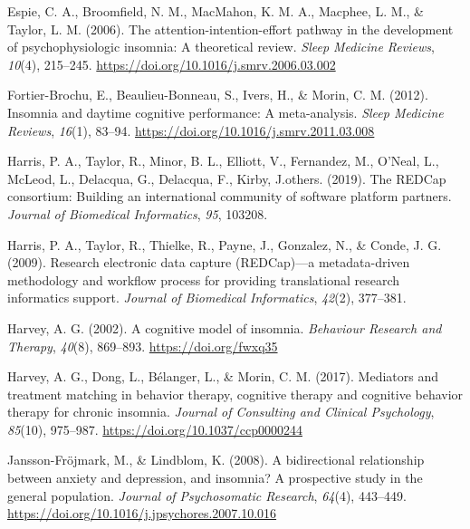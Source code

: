 \documentclass[
  ,doc,11pt, twoside,floatsintext]{apa6}
\newlength{\cslhangindent}
\newlength{\cslentryspacingunit} %
\newenvironment{CSLReferences}[2] %
 {%
  \setlength{\parindent}{0pt}
  \ifodd #1
  \let\oldpar\par
  \def\par{\hangindent=\cslhangindent\oldpar}
  \fi
  \setlength{\parskip}{#2\cslentryspacingunit}
 }%
 {}
\begin{document}
\begin{CSLReferences}{1}{0}
\leavevmode{}%
Espie, C. A., Broomfield, N. M., MacMahon, K. M. A., Macphee, L. M., \& Taylor, L. M. (2006). The attention-intention-effort pathway in the development of psychophysiologic insomnia: A theoretical review. \emph{Sleep Medicine Reviews}, \emph{10}(4), 215--245. \url{https://doi.org/10.1016/j.smrv.2006.03.002}

\leavevmode{}%
Fortier-Brochu, E., Beaulieu-Bonneau, S., Ivers, H., \& Morin, C. M. (2012). Insomnia and daytime cognitive performance: A meta-analysis. \emph{Sleep Medicine Reviews}, \emph{16}(1), 83--94. \url{https://doi.org/10.1016/j.smrv.2011.03.008}

\leavevmode{}%
Harris, P. A., Taylor, R., Minor, B. L., Elliott, V., Fernandez, M., O'Neal, L., McLeod, L., Delacqua, G., Delacqua, F., Kirby, J.others. (2019). The REDCap consortium: Building an international community of software platform partners. \emph{Journal of Biomedical Informatics}, \emph{95}, 103208.

\leavevmode{}%
Harris, P. A., Taylor, R., Thielke, R., Payne, J., Gonzalez, N., \& Conde, J. G. (2009). Research electronic data capture (REDCap)---a metadata-driven methodology and workflow process for providing translational research informatics support. \emph{Journal of Biomedical Informatics}, \emph{42}(2), 377--381.

\leavevmode{}%
Harvey, A. G. (2002). A cognitive model of insomnia. \emph{Behaviour Research and Therapy}, \emph{40}(8), 869--893. \url{https://doi.org/fwxq35}

\leavevmode{}%
Harvey, A. G., Dong, L., Bélanger, L., \& Morin, C. M. (2017). Mediators and treatment matching in behavior therapy, cognitive therapy and cognitive behavior therapy for chronic insomnia. \emph{Journal of Consulting and Clinical Psychology}, \emph{85}(10), 975--987. \url{https://doi.org/10.1037/ccp0000244}

\leavevmode{}%
Jansson-Fröjmark, M., \& Lindblom, K. (2008). A bidirectional relationship between anxiety and depression, and insomnia? {A} prospective study in the general population. \emph{Journal of Psychosomatic Research}, \emph{64}(4), 443--449. \url{https://doi.org/10.1016/j.jpsychores.2007.10.016}


\end{CSLReferences}
\end{document}

